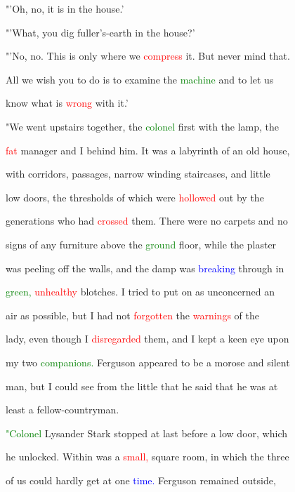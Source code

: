  "'Oh, no, it is in the house.'



 "'What, you dig fuller's-earth in the house?'



 "'No, no. This is only where we \textcolor{red}{compress} it. But never mind that.

 All we wish you to do is to examine the \textcolor{green}{machine} and to let us

 know what is \textcolor{red}{wrong} with it.'



 "We went upstairs together, the \textcolor{green}{colonel} first with the lamp, the

 \textcolor{red}{fat} manager and I behind him. It was a \textcolor{BurntOrange}{labyrinth} of an old house,

 with corridors, passages, narrow winding staircases, and little

 low doors, the thresholds of which were \textcolor{red}{hollowed} out by the

 generations who had \textcolor{red}{crossed} them. There were no carpets and no

 signs of any furniture above the \textcolor{green}{ground} floor, while the plaster

 was peeling off the walls, and the damp was \textcolor{blue}{breaking} through in

 \textcolor{green}{green,} \textcolor{red}{unhealthy} blotches. I tried to put on as unconcerned an

 air as possible, but I had not \textcolor{red}{forgotten} the \textcolor{red}{warnings} of the

 lady, even though I \textcolor{red}{disregarded} them, and I kept a keen eye upon

 my two \textcolor{green}{companions.} Ferguson appeared to be a morose and silent

 man, but I could see from the little that he said that he was at

 least a fellow-countryman.



 \textcolor{green}{"Colonel} Lysander \textcolor{BurntOrange}{Stark} stopped at last before a low door, which

 he unlocked. Within was a \textcolor{red}{small,} square room, in which the three

 of us could hardly get at one \textcolor{blue}{time.} Ferguson remained outside,

